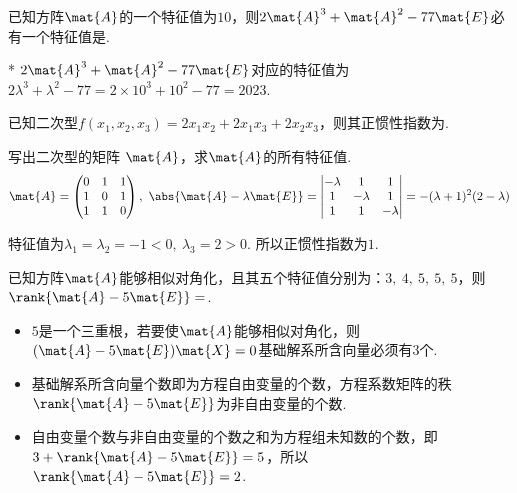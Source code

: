 \begin{problem}
    已知方阵$\mat{A}$的一个特征值为$10$，则$2\mat{A}^3+\mat{A}^2-77\mat{E}$必有一个特征值是.
\end{problem}
\begin{solution}*
    $2\mat{A}^3+\mat{A}^2-77\mat{E}$对应的特征值为$2\lambda^3+\lambda^2-77=2\times 10^3+10^2-77=2023$.
\end{solution}

\begin{problem}
    已知二次型$f(x_1,x_2,x_3)=2x_1x_2+2x_1x_3+2x_2x_3$，则其正惯性指数为.
\end{problem}
\begin{solution}
    写出二次型的矩阵
    $\mat{A}$，求$\mat{A}$的所有特征值.
    \[
    \mat{A}=\begin{pmatrix}
        0 & 1 & 1\\
        1 & 0 & 1\\
        1 & 1 & 0
    \end{pmatrix},\ 
    \abs{\mat{A}-\lambda\mat{E}}=\begin{vmatrix}
        -\lambda & 1 & 1\\
        1 & -\lambda & 1\\
        1 & 1 & -\lambda
    \end{vmatrix}=-(\lambda+1)^2(2-\lambda)
    \]

    特征值为$\lambda_1=\lambda_2=-1<0,\ \lambda_3=2>0$. 所以正惯性指数为$1$.
\end{solution}

\begin{problem}
    已知方阵$\mat{A}$能够相似对角化，且其五个特征值分别为：$3,\ 4,\ 5,\ 5,\ 5$，则$\rank{\mat{A}-5\mat{E}}=$.
\end{problem}
\begin{solution}
\begin{itemize}
    \item $5$是一个三重根，若要使$\mat{A}$能够相似对角化，则$(\mat{A}-5\mat{E})\mat{X}=0$基础解系所含向量必须有$3$个.
    \item 基础解系所含向量个数即为方程自由变量的个数，方程系数矩阵的秩$\rank{\mat{A}-5\mat{E}}$为非自由变量的个数.
    \item 自由变量个数与非自由变量的个数之和为方程组未知数的个数，即$3+\rank{\mat{A}-5\mat{E}}=5$，所以$\rank{\mat{A}-5\mat{E}}=2$.
\end{itemize}
\end{solution}

